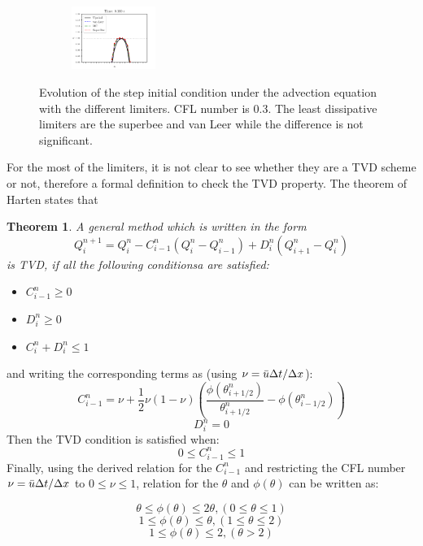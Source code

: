 \documentclass[journal,onecolumn]{IEEEtran}
\begin{document}
\begin{figure}
\begin{subfigure}{\textwidth}
    \end{subfigure}
        \begin{subfigure}{\textwidth}
    \centering
    \includegraphics[width=0.3\textwidth]{figures/limiter0.160.pdf}
    \end{subfigure}
    \caption{Evolution of the step initial condition under the advection equation with the different limiters. CFL number is 0.3. The least dissipative limiters are the superbee and van Leer while the difference is not significant.}
    \label{fig:lax_wendroff}
\end{figure}

For the most of the limiters, it is not clear to see whether they are a TVD scheme or not, therefore a formal definition to check the TVD property. The theorem of Harten states that

\newtheorem{theorem}{Theorem}
\begin{theorem}
    A general method which is written in the form
    $$
    Q_i^{n+1} = Q_i^n - C_{i-1}^n(Q_i^n - Q_{i-1}^n) + D_i^n(Q_{i+1}^n - Q_i^n)
    $$
    is TVD, if all the following conditionsa are satisfied:
\end{theorem}

    \begin{itemize}
        \item $C_{i-1}^n \geq 0$
        \item $D_i^n \geq 0$
        \item $C_i^n + D_i^n \leq 1$
    \end{itemize}

and writing the corresponding terms as (using ${\nu = \Bar{u}\Delta t}/{\Delta x}$):
$$
C_{i-1}^n = \nu + \frac{1}{2}\nu (1 - \nu)\left( \frac{\phi(\theta_{i+1/2}^n) }{\theta_{i+1/2}^n} - \phi(\theta_{i-1/2}^n)  \right)
$$
$$
D_i^n = 0
$$
Then the TVD condition is satisfied when:
$$
0 \leq C_{i-1}^n \leq 1
$$
Finally, using the derived relation for the $C_{i-1}^n$ and restricting the CFL number ${\nu = \Bar{u}\Delta t}/{\Delta x}$ to $0 \leq \nu \leq 1$, relation for the $\theta$ and $\phi(\theta)$ can be written as:

$$
\theta \leq \phi(\theta) \leq 2\theta, (0 \leq \theta \leq 1)
$$
$$
1 \leq \phi(\theta) \leq \theta, (1 \leq \theta \leq 2)
$$
$$
1 \leq \phi(\theta) \leq 2, (\theta > 2)
$$
\end{document}
